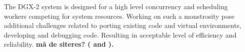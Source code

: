 The DGX-2 system is designed for a high level concurrency and scheduling workers competing for system resources. Working on such a monstrosity pose additional challenges related to porting existing code and virtual environments, developing and debugging code. Resulting in %
acceptable level of efficiency and reliability. \textbf{må de siteres? (\cite{ex3docs} and \cite{ex3homepage}).} 



